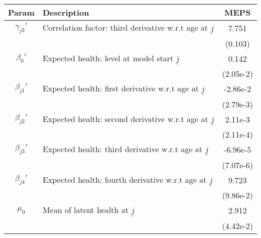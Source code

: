 \begin{table}[ht]\label{MEPSmenHealthParams}
\footnotesize
\begin{center}
\begin{tabular}{clc}
\hline \hline
Param & Description & MEPS \\
\hline
$\gamma_{j3}'$ & Correlation factor: third derivative w.r.t age at $\underline{j}$ & 7.751 \\
 & & (0.103) \\
$\beta_{0}'$ & Expected health: level at model start $\underline{j}$ & 0.142 \\
 & & (2.05e-2) \\
$\beta_{j1}'$ & Expected health: first derivative w.r.t age at $\underline{j}$ & -2.86e-2 \\
 & & (2.79e-3) \\
$\beta_{j2}'$ & Expected health: second derivative w.r.t age at $\underline{j}$ & 2.11e-3 \\
 & & (2.11e-4) \\
$\beta_{j3}'$ & Expected health: third derivative w.r.t age at $\underline{j}$ & -6.96e-5 \\
 & & (7.07e-6) \\
$\beta_{j4}'$ & Expected health: fourth derivative w.r.t age at $\underline{j}$ & 9.723 \\
 & & (9.86e-2) \\
$\mu_0$ & Mean of latent health at $\underline{j}$ & 2.912 \\
 & & (4.42e-2) \\
\hline\hline
\end{tabular}
\end{center}
\end{table}
